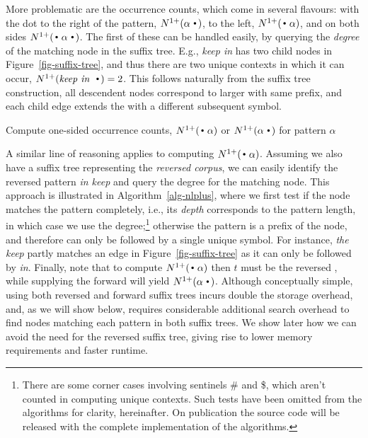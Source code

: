 More problematic are the occurrence counts, which come in several
flavours: with the dot to the right of the pattern, $\nlplus{\patdot}$,
to the left,  $\nlplus{\dotpat}$, and on both sides
$\nlplus{\dotpatdot}$. The first of these can be handled easily, by
querying the \emph{degree} of the matching node in the suffix tree. E.g., 
\emph{keep in} has two child nodes in  Figure~\ref{fig-suffix-tree},  
and thus there are two unique contexts in
which it can occur, $\nlplus{\emph{keep in~}\Bigcdot}=2$. This follows naturally from the suffix tree
construction, all descendent nodes correspond to larger \ngrams with
same prefix, and each child edge extends the \ngram with a different
subsequent symbol. 

\begin{algorithm}[th]
  \caption{Compute one-sided occurrence counts, $\nlplus{\dotpat}$ or $\nlplus{\patdot}$ for pattern $\alpha$ 
    \label{alg:n1plus}}
  \begin{algorithmic}[1]
        \Else
        \EndIf
      \State {}
    \EndFunction
  \end{algorithmic}
\label{alg-nlplus}
\end{algorithm}

A similar line of reasoning applies to computing
$\nlplus{\dotpat}$. Assuming we also have a suffix tree representing
the \emph{reversed corpus}, we can easily identify the reversed pattern
\emph{in keep} and query the degree for the matching node. This
approach is illustrated in Algorithm~\ref{alg-nlplus}, where we first
test if the node matches the pattern completely, i.e., its
\emph{depth} corresponds to the pattern length, in which case we use
the degree;\footnote{There are some corner cases involving sentinels \#
  and \$, which aren't counted in computing unique contexts.
  Such tests have been omitted from the algorithms for clarity, hereinafter. On publication the
  source code will be released with the complete implementation of the
  algorithms.}
otherwise the pattern is a prefix of the node, and
therefore can only be followed by a single unique symbol. 
For instance, \emph{the keep} partly matches an edge in
Figure~\ref{fig-suffix-tree} as it can only be followed by \emph{in}.
Finally, note that to compute $\nlplus{\dotpat}$ then $t$ must be the reversed \CST,
while supplying the forward \CST will yield $\nlplus{\patdot}$. Although
conceptually simple, using both reversed and forward suffix trees incurs double the storage overhead,
and, as we will show below, requires considerable additional search
overhead to find nodes matching each \ngram pattern in both suffix trees. We show later
how we can avoid the need for the reversed suffix tree, giving rise to
lower memory requirements and faster runtime.

